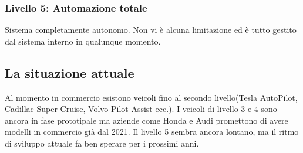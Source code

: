 \subsubsection{Livello 5: Automazione totale}
Sistema completamente autonomo. Non vi è alcuna limitazione ed è tutto gestito dal sistema interno in qualunque momento. 
\subsection{La situazione attuale}
Al momento in commercio esistono veicoli fino al secondo livello(Tesla AutoPilot, Cadillac Super Cruise, Volvo Pilot Assist ecc.). I veicoli di livello 3 e 4 sono ancora in fase prototipale
ma aziende come Honda e Audi promettono  di avere modelli in commercio già dal 2021\cite{honda}. Il livello 5 sembra ancora lontano, ma il ritmo di sviluppo attuale fa ben sperare per i prossimi anni.
    